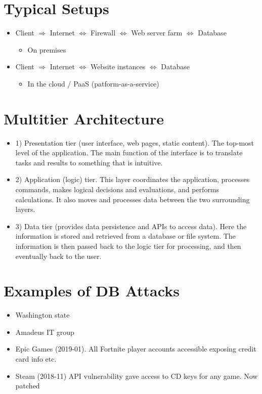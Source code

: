 \documentclass[11pt]{article}
\begin{document}
\section*{Typical Setups}
\begin{itemize}
	\item Client $\Rightarrow$ Internet $\Leftrightarrow$ Firewall $\Leftrightarrow$ Web server farm $\Leftrightarrow$ Database
		\begin{itemize}
			\item On premises
		\end{itemize}
	\item Client $\Rightarrow$ Internet $\Leftrightarrow$ Website instances  $\Leftrightarrow$ Database
		 \begin{itemize}
			\item In the cloud / PaaS (patform-as-a-service)
		\end{itemize}
\end{itemize}

\section*{Multitier Architecture}

\begin{itemize}
	\item 1) Presentation tier (user interface, web pages, static content). The top-most level of the application. The main function of the interface is to translate tasks and results to something that is intuitive.
	\item 2) Application (logic) tier. This layer coordinates the application, processes commands, makes logical decisions and evaluations, and performs calculations. It also moves and processes data between the two surrounding layers.
	\item 3) Data tier (provides data persistence and APIs to access data). Here the information is stored and retrieved from a database or file system. The information is then passed back to the logic tier for processing, and then eventually back to the user.
\end{itemize}

\section*{Examples of DB Attacks}
\begin{itemize}
	\item Washington state
	\item Amadeus IT group
	\item Epic Games (2019-01). All Fortnite player accounts accessible exposing credit card info etc.
	\item Steam (2018-11) API vulnerability gave access to CD keys for any game. Now patched
\end{itemize}
\end{document}
